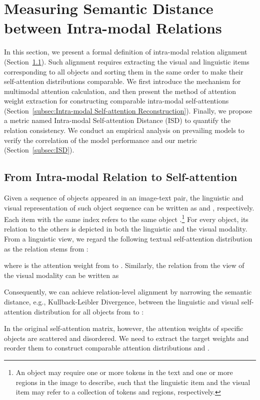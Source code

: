 \documentclass[11pt,a4paper]{article}
\begin{document}
\section{Measuring Semantic Distance between Intra-modal Relations}
In this section, we present a formal definition of intra-modal relation alignment (Section~\ref{subsec:formal definition}). 
Such alignment requires extracting the visual and linguistic items corresponding to all objects and sorting them in the same order to make their self-attention distributions comparable. 
We first introduce the mechanism for multimodal attention calculation, and then present the method of attention weight extraction for constructing comparable intra-modal self-attentions (Section~\ref{subsec:Intra-modal Self-attention Reconstruction}).  
Finally, we propose a metric named Intra-modal Self-attention Distance (ISD) to quantify the relation consistency. 
We conduct an empirical analysis on prevailing models to verify the correlation of the model performance and our metric (Section~\ref{subsec:ISD}). 

\subsection{From Intra-modal Relation to Self-attention}
\label{subsec:formal definition}
Given a sequence  of  objects appeared in an image-text pair, the linguistic and visual representation of such object sequence can be written as  and , respectively. 
Each item  with the same index refers to the same object .\footnote{An object  may require one or more tokens in the text and one or more regions in the image to describe, such that the linguistic item  and the visual item  may refer to a collection of tokens and regions, respectively.} 
For every object, its relation   
to the others is depicted in both the linguistic and the visual modality. 
From a linguistic view, we regard the following textual self-attention distribution as the relation  stems from : 

where  is the attention weight from  to . 
Similarly, the relation  from the view of the visual modality can be written as

Consequently, we can achieve relation-level alignment by narrowing the semantic distance, e.g., Kullback-Leibler Divergence, between the linguistic and visual self-attention distribution for all objects from  to : 

In the original self-attention matrix, however, the attention weights of specific objects are scattered and disordered. 
We need to extract the target weights and reorder them to construct comparable attention distributions  and . 
\end{document}
